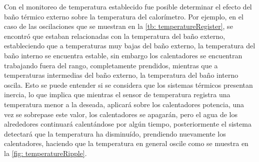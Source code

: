 	\newpage

	Con el monitoreo de temperatura establecido fue posible determinar el efecto del baño térmico externo sobre la temperatura del calorímetro. Por ejemplo, en el caso de las oscilaciones que se muestran en la \autoref{tb: temperatureRegister}, se encontr\'o que estaban relacionadas con la temperatura del baño externo, estableciendo que a temperaturas muy bajas del baño externo, la temperatura del baño interno se encuentra estable, sin embargo los calentadores se encuentran trabajando fuera del rango, completamente prendidos, mientras que a temperaturas intermedias del baño externo, la temperatura del baño interno oscila. Esto se puede entender si se considera que los sistemas térmicos presentan inercia, lo que implica que mientras el sensor de temperatura registra una temperatura menor a la deseada, aplicará sobre los calentadores potencia, una vez se sobrepase este valor, los calentadores se apagarán, pero el agua de los alrededores continuará calent\'andose por algún tiempo, posteriormente el sistema detectará que la temperatura ha disminuído, prendiendo nuevamente los calentadores, haciendo que la temperatura en general oscile como se muestra en la \autoref{fig: temperatureRipple}.
